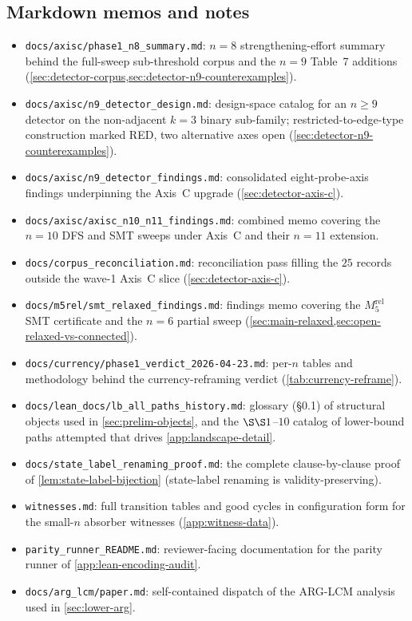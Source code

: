 \documentclass[11pt,a4paper]{article}
\theoremstyle{plain}
\theoremstyle{definition}
\begin{document}
\subsection{Markdown memos and notes}\label{app:manifest-md}
\begin{itemize}[leftmargin=*]
\item \texttt{docs/axisc/phase1\_n8\_summary.md}: $n = 8$ strengthening-effort summary behind the full-sweep
 sub-threshold corpus and the $n = 9$ Table~7 additions
 (\cref{sec:detector-corpus,sec:detector-n9-counterexamples}).
\item \texttt{docs/axisc/n9\_detector\_design.md}: design-space catalog for an $n \ge 9$ detector on the
 non-adjacent $k = 3$ binary sub-family; restricted-to-edge-type
 construction marked RED, two alternative axes open
 (\cref{sec:detector-n9-counterexamples}).
\item \texttt{docs/axisc/n9\_detector\_findings.md}: consolidated eight-probe-axis findings underpinning the
 Axis~C upgrade (\cref{sec:detector-axis-c}).
\item \texttt{docs/axisc/axisc\_n10\_n11\_findings.md}: combined memo covering the $n = 10$ DFS and SMT sweeps under
 Axis~C and their $n = 11$ extension.
\item \texttt{docs/corpus\_reconciliation.md}: reconciliation pass filling the $25$ records outside the
 wave-1 Axis~C slice (\cref{sec:detector-axis-c}).
\item \texttt{docs/m5rel/smt\_relaxed\_findings.md}: findings memo covering the $M_5^{\mathrm{rel}}$ SMT
 certificate and the $n = 6$ partial sweep
 (\cref{sec:main-relaxed,sec:open-relaxed-vs-connected}).
\item \texttt{docs/currency/phase1\_verdict\_2026-04-23.md}: per-$n$ tables and methodology behind the currency-reframing
 verdict (\cref{tab:currency-reframe}).
\item \texttt{docs/lean\_docs/lb\_all\_paths\_history.md}: glossary
 (\S0.1) of structural objects used in
 \cref{sec:prelim-objects}, and the $\S\S1$--$10$ catalog of
 lower-bound paths attempted that drives
 \cref{app:landscape-detail}.
\item \texttt{docs/state\_label\_renaming\_proof.md}: the
 complete clause-by-clause proof of
 \cref{lem:state-label-bijection} (state-label renaming is
 validity-preserving).
\item \texttt{witnesses.md}: full transition tables and good
 cycles in configuration form for the small-$n$ absorber witnesses
 (\cref{app:witness-data}).
\item \texttt{parity\_runner\_README.md}: reviewer-facing
 documentation for the parity runner of
 \cref{app:lean-encoding-audit}.
\item \texttt{docs/arg\_lcm/paper.md}: self-contained dispatch
 of the ARG-LCM analysis used in \cref{sec:lower-arg}.
\end{itemize}



\end{document}
